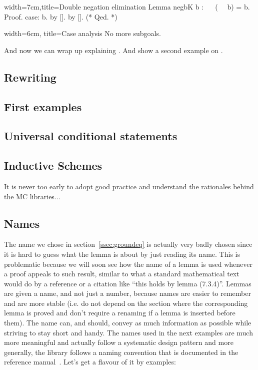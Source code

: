 \begin{coq}{width=7cm,title=Double negation elimination}
Lemma negbK b : ~~ (~~ b) = b.
Proof.
case: b.
  by [].
by [].
(* Qed. *)
\end{coq}
\begin{coqout}{width=6cm, title=Case analysis}
No more subgoals.
$~$
$~$
$~$
$~$
$~$
\end{coqout}

And now we can wrap up explaining . And show a second example on
.

\subsection{Rewriting}


\subsection{First examples}

\subsection{Universal conditional statements}

\subsection{Inductive Schemes}

It is never too early to adopt good practice and understand the
rationales behind the MC libraries...

\subsection{Names}
 The name  we chose in
section~\ref{ssec:groundeq} is actually very badly chosen since it is
hard to guess what the lemma is about by just reading its name.
This is problematic because we will soon see how the name of a lemma
is used whenever a proof appeals to such result,
similar to what a standard mathematical text would do by a reference or
a citation like ``this holds by lemma (7.3.4)''.  Lemmas are given a name,
and not just a number, because names are easier to remember and are more
stable (i.e. do not depend on the section where the corresponding lemma
is proved and don't require a renaming if a lemma is inserted before them).
The name can, and should, convey as much information as possible while
striving to stay short and handy. The
names used in the next examples are much more meaningful and actually
follow a systematic design pattern and more generally, the \mcbMC{}
library follows a naming convention that is documented in the
reference manual~\cite{ssrman}. Let's get a flavour of it by examples:

